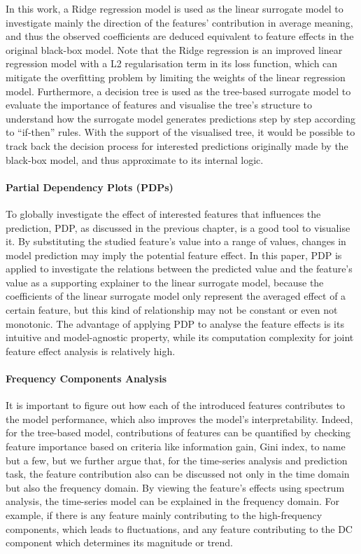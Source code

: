 \documentclass[11pt]{article}
\begin{document}
    In this work, a Ridge regression model is used as the linear surrogate model to investigate mainly the direction of the features’ contribution in average meaning, and thus the observed coefficients are deduced equivalent to feature effects in the original black-box model. Note that the Ridge regression is an improved linear regression model with a L2 regularisation term in its loss function, which can mitigate the overfitting problem by limiting the weights of the linear regression model. Furthermore, a decision tree is used as the tree-based surrogate model to evaluate the importance of features and visualise the tree’s structure to understand how the surrogate model generates predictions step by step according to “if-then” rules. With the support of the visualised tree, it would be possible to track back the decision process for interested predictions originally made by the black-box model, and thus approximate to its internal logic.
    
    \paragraph{Partial Dependency Plots (PDPs)}
    To globally investigate the effect of interested features that influences the prediction, PDP, as discussed in the previous chapter, is a good tool to visualise it. By substituting the studied feature’s value into a range of values, changes in model prediction may imply the potential feature effect. In this paper, PDP is applied to investigate the relations between the predicted value and the feature’s value as a supporting explainer to the linear surrogate model, because the coefficients of the linear surrogate model only represent the averaged effect of a certain feature, but this kind of relationship may not be constant or even not monotonic. The advantage of applying PDP to analyse the feature effects is its intuitive and model-agnostic property, while its computation complexity for joint feature effect analysis is relatively high.
    
    \paragraph{Frequency Components Analysis}
    It is important to figure out how each of the introduced features contributes to the model performance, which also improves the model’s interpretability. Indeed, for the tree-based model, contributions of features can be quantified by checking feature importance based on criteria like information gain, Gini index, to name but a few, but we further argue that, for the time-series analysis and prediction task, the feature contribution also can be discussed not only in the time domain but also the frequency domain. By viewing the feature’s effects using spectrum analysis, the time-series model can be explained in the frequency domain. For example, if there is any feature mainly contributing to the high-frequency components, which leads to fluctuations, and any feature contributing to the DC component which determines its magnitude or trend.
    
\end{document}
